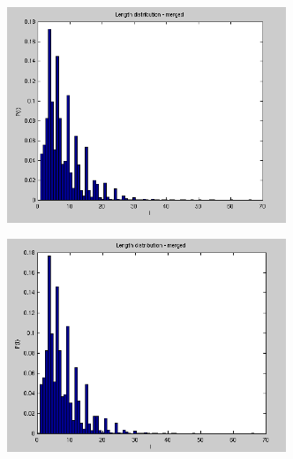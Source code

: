 \begin{figure}[H]
  \centering
  \begin{subfigure}{0.45\textwidth}
    \centering
    \includegraphics[width=0.92\textwidth]{Figures/chapter-image/avizo/ActinZ39b21l5-histo-length.png}%
  \end{subfigure}
  \begin{subfigure}{0.45\textwidth}
    \centering
    \includegraphics[width=0.92\textwidth]{Figures/chapter-image/avizo/ActinZ39b21l8-histo-length.png}%
  \end{subfigure}\\[1ex]
  \begin{subfigure}{0.45\textwidth}
    \centering

\end{subfigure}
\end{figure}
